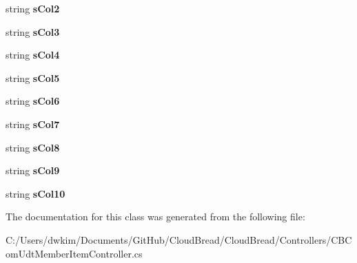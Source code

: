 \begin{DoxyCompactItemize}
\item 
string {\bfseries s\+Col2}\hypertarget{a00109_a3ab9db23b5eaaf372660c4224b7f82a4}{}\label{a00109_a3ab9db23b5eaaf372660c4224b7f82a4}

\item 
string {\bfseries s\+Col3}\hypertarget{a00109_a7044c514c78c82cf8ffea940cbf07475}{}\label{a00109_a7044c514c78c82cf8ffea940cbf07475}

\item 
string {\bfseries s\+Col4}\hypertarget{a00109_a82ed0961d5aaf94f6adaf758448a3918}{}\label{a00109_a82ed0961d5aaf94f6adaf758448a3918}

\item 
string {\bfseries s\+Col5}\hypertarget{a00109_a681e8305417df728bcccfde573e0a036}{}\label{a00109_a681e8305417df728bcccfde573e0a036}

\item 
string {\bfseries s\+Col6}\hypertarget{a00109_af921de0449adc10868487663d48c3de5}{}\label{a00109_af921de0449adc10868487663d48c3de5}

\item 
string {\bfseries s\+Col7}\hypertarget{a00109_a6dd8d230b9ed7906970bf88fc022e48e}{}\label{a00109_a6dd8d230b9ed7906970bf88fc022e48e}

\item 
string {\bfseries s\+Col8}\hypertarget{a00109_a7bf9265aecef0f62323f210ff150839e}{}\label{a00109_a7bf9265aecef0f62323f210ff150839e}

\item 
string {\bfseries s\+Col9}\hypertarget{a00109_a9cac90b36d02f82e9b19fd8978d3b506}{}\label{a00109_a9cac90b36d02f82e9b19fd8978d3b506}

\item 
string {\bfseries s\+Col10}\hypertarget{a00109_ad40373e1704c6f0f70c985c59927ff18}{}\label{a00109_ad40373e1704c6f0f70c985c59927ff18}

\end{DoxyCompactItemize}


The documentation for this class was generated from the following file\+:\begin{DoxyCompactItemize}
\item 
C\+:/\+Users/dwkim/\+Documents/\+Git\+Hub/\+Cloud\+Bread/\+Cloud\+Bread/\+Controllers/C\+B\+Com\+Udt\+Member\+Item\+Controller.\+cs\end{DoxyCompactItemize}
